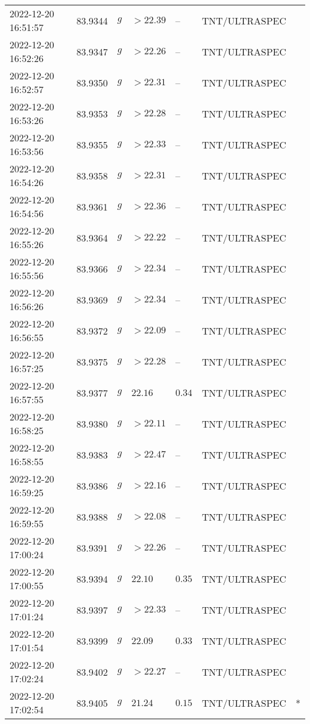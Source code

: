 \documentclass{nature_plusfigure}
\begin{document}
\begin{supplement}
\begin{center}
\begin{longtable}{lllllll}
2022-12-20 16:51:57 & 83.9344 & $g$ & $>22.39$ & -- & TNT/ULTRASPEC &  \\ 
2022-12-20 16:52:26 & 83.9347 & $g$ & $>22.26$ & -- & TNT/ULTRASPEC &  \\ 
2022-12-20 16:52:57 & 83.9350 & $g$ & $>22.31$ & -- & TNT/ULTRASPEC &  \\ 
2022-12-20 16:53:26 & 83.9353 & $g$ & $>22.28$ & -- & TNT/ULTRASPEC &  \\ 
2022-12-20 16:53:56 & 83.9355 & $g$ & $>22.33$ & -- & TNT/ULTRASPEC &  \\ 
2022-12-20 16:54:26 & 83.9358 & $g$ & $>22.31$ & -- & TNT/ULTRASPEC &  \\ 
2022-12-20 16:54:56 & 83.9361 & $g$ & $>22.36$ & -- & TNT/ULTRASPEC &  \\ 
2022-12-20 16:55:26 & 83.9364 & $g$ & $>22.22$ & -- & TNT/ULTRASPEC &  \\ 
2022-12-20 16:55:56 & 83.9366 & $g$ & $>22.34$ & -- & TNT/ULTRASPEC &  \\ 
2022-12-20 16:56:26 & 83.9369 & $g$ & $>22.34$ & -- & TNT/ULTRASPEC &  \\ 
2022-12-20 16:56:55 & 83.9372 & $g$ & $>22.09$ & -- & TNT/ULTRASPEC &  \\ 
2022-12-20 16:57:25 & 83.9375 & $g$ & $>22.28$ & -- & TNT/ULTRASPEC &  \\ 
2022-12-20 16:57:55 & 83.9377 & $g$ & $22.16$ & $0.34$ & TNT/ULTRASPEC &  \\ 
2022-12-20 16:58:25 & 83.9380 & $g$ & $>22.11$ & -- & TNT/ULTRASPEC &  \\ 
2022-12-20 16:58:55 & 83.9383 & $g$ & $>22.47$ & -- & TNT/ULTRASPEC &  \\ 
2022-12-20 16:59:25 & 83.9386 & $g$ & $>22.16$ & -- & TNT/ULTRASPEC &  \\ 
2022-12-20 16:59:55 & 83.9388 & $g$ & $>22.08$ & -- & TNT/ULTRASPEC &  \\ 
2022-12-20 17:00:24 & 83.9391 & $g$ & $>22.26$ & -- & TNT/ULTRASPEC &  \\ 
2022-12-20 17:00:55 & 83.9394 & $g$ & $22.10$ & $0.35$ & TNT/ULTRASPEC &  \\ 
2022-12-20 17:01:24 & 83.9397 & $g$ & $>22.33$ & -- & TNT/ULTRASPEC &  \\ 
2022-12-20 17:01:54 & 83.9399 & $g$ & $22.09$ & $0.33$ & TNT/ULTRASPEC &  \\ 
2022-12-20 17:02:24 & 83.9402 & $g$ & $>22.27$ & -- & TNT/ULTRASPEC &  \\ 
2022-12-20 17:02:54 & 83.9405 & $g$ & $21.24$ & $0.15$ & TNT/ULTRASPEC & * \\ 

\end{longtable}
\end{center}
\end{supplement}
\end{document}
